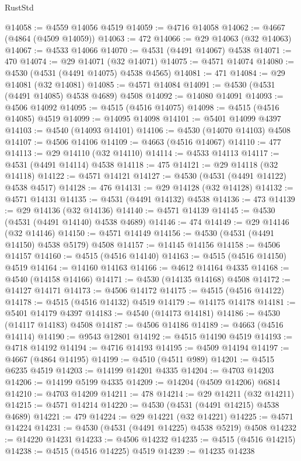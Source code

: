 \begin{lexlean}{RustStd}
\begin{coremodule}
@14058 := @4559 @14056 @4519
@14059 := @4716 @14058
@14062 := @4667 (@4864 (@4509 @14059))
@14063 := 472
@14066 := @29 @14063 (@32 @14063)
@14067 := @4533 @14066
@14070 := @4531 (@4491 @14067) @4538
@14071 := 470
@14074 := @29 @14071 (@32 @14071)
@14075 := @4571 @14074
@14080 := @4530 (@4531 (@4491 @14075) @4538 @4565)
@14081 := 471
@14084 := @29 @14081 (@32 @14081)
@14085 := @4571 @14084
@14091 := @4530 (@4531 (@4491 @14085) @4538 @4689) @4508
@14092 := @14080 @14091
@14093 := @4506 @14092
@14095 := @4515 (@4516 @14075)
@14098 := @4515 (@4516 @14085) @4519
@14099 := @14095 @14098
@14101 := @5401 @14099 @4397
@14103 := @4540 (@14093 @14101)
@14106 := @4530 (@14070 @14103) @4508
@14107 := @4506 @14106
@14109 := @4663 (@4516 @14067)
@14110 := 477
@14113 := @29 @14110 (@32 @14110)
@14114 := @4533 @14113
@14117 := @4531 (@4491 @14114) @4538
@14118 := 475
@14121 := @29 @14118 (@32 @14118)
@14122 := @4571 @14121
@14127 := @4530 (@4531 (@4491 @14122) @4538 @4517)
@14128 := 476
@14131 := @29 @14128 (@32 @14128)
@14132 := @4571 @14131
@14135 := @4531 (@4491 @14132) @4538
@14136 := 473
@14139 := @29 @14136 (@32 @14136)
@14140 := @4571 @14139
@14145 := @4530 (@4531 (@4491 @14140) @4538 @4689)
@14146 := 474
@14149 := @29 @14146 (@32 @14146)
@14150 := @4571 @14149
@14156 := @4530 (@4531 (@4491 @14150) @4538 @5179) @4508
@14157 := @14145 @14156
@14158 := @4506 @14157
@14160 := @4515 (@4516 @14140)
@14163 := @4515 (@4516 @14150) @4519
@14164 := @14160 @14163
@14166 := @4612 @14164 @4335
@14168 := @4540 (@14158 @14166)
@14171 := @4530 (@14135 @14168) @4508
@14172 := @14127 @14171
@14173 := @4506 @14172
@14175 := @4515 (@4516 @14122)
@14178 := @4515 (@4516 @14132) @4519
@14179 := @14175 @14178
@14181 := @5401 @14179 @4397
@14183 := @4540 (@14173 @14181)
@14186 := @4530 (@14117 @14183) @4508
@14187 := @4506 @14186
@14189 := @4663 (@4516 @14114)
@14190 := @9543 @12801
@14192 := @4515 @14190 @4519
@14193 := @4718 @14192
@14194 := @4716 @14193
@14195 := @4509 @14194
@14197 := @4667 (@4864 @14195)
@14199 := @4510 (@4511 @989)
@14201 := @4515 @6235 @4519
@14203 := @14199 @14201 @4335
@14204 := @4703 @14203
@14206 := @14199 @5199 @4335
@14209 := @14204 (@4509 @14206) @6814
@14210 := @4703 @14209
@14211 := 478
@14214 := @29 @14211 (@32 @14211)
@14215 := @4571 @14214
@14220 := @4530 (@4531 (@4491 @14215) @4538 @4689)
@14221 := 479
@14224 := @29 @14221 (@32 @14221)
@14225 := @4571 @14224
@14231 := @4530 (@4531 (@4491 @14225) @4538 @5219) @4508
@14232 := @14220 @14231
@14233 := @4506 @14232
@14235 := @4515 (@4516 @14215)
@14238 := @4515 (@4516 @14225) @4519
@14239 := @14235 @14238

\end{coremodule}
\end{lexlean}

